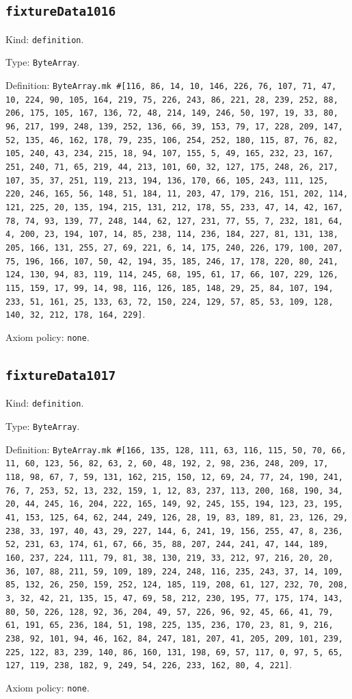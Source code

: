 \documentclass[11pt]{article}
\begin{document}
\subsection*{\texttt{fixtureData1016}}
\noindent Kind: \texttt{definition}.\par
\noindent Type: \texttt{ByteArray}.\par
\noindent Definition: \texttt{ByteArray.mk \#[116, 86, 14, 10, 146, 226, 76, 107, 71, 47, 10, 224, 90, 105, 164, 219, 75, 226, 243, 86, 221, 28, 239, 252, 88, 206, 175, 105, 167, 136, 72, 48, 214, 149, 246, 50, 197, 19, 33, 80, 96, 217, 199, 248, 139, 252, 136, 66, 39, 153, 79, 17, 228, 209, 147, 52, 135, 46, 162, 178, 79, 235, 106, 254, 252, 180, 115, 87, 76, 82, 105, 240, 43, 234, 215, 18, 94, 107, 155, 5, 49, 165, 232, 23, 167, 251, 240, 71, 65, 219, 44, 213, 101, 60, 32, 127, 175, 248, 26, 217, 107, 35, 37, 251, 119, 213, 194, 136, 170, 66, 105, 243, 111, 125, 220, 246, 165, 56, 148, 51, 184, 11, 203, 47, 179, 216, 151, 202, 114, 121, 225, 20, 135, 194, 215, 131, 212, 178, 55, 233, 47, 14, 42, 167, 78, 74, 93, 139, 77, 248, 144, 62, 127, 231, 77, 55, 7, 232, 181, 64, 4, 200, 23, 194, 107, 14, 85, 238, 114, 236, 184, 227, 81, 131, 138, 205, 166, 131, 255, 27, 69, 221, 6, 14, 175, 240, 226, 179, 100, 207, 75, 196, 166, 107, 50, 42, 194, 35, 185, 246, 17, 178, 220, 80, 241, 124, 130, 94, 83, 119, 114, 245, 68, 195, 61, 17, 66, 107, 229, 126, 115, 159, 17, 99, 14, 98, 116, 126, 185, 148, 29, 25, 84, 107, 194, 233, 51, 161, 25, 133, 63, 72, 150, 224, 129, 57, 85, 53, 109, 128, 140, 32, 212, 178, 164, 229]}.\par
\noindent Axiom policy: \texttt{none}.\par
\subsection*{\texttt{fixtureData1017}}
\noindent Kind: \texttt{definition}.\par
\noindent Type: \texttt{ByteArray}.\par
\noindent Definition: \texttt{ByteArray.mk \#[166, 135, 128, 111, 63, 116, 115, 50, 70, 66, 11, 60, 123, 56, 82, 63, 2, 60, 48, 192, 2, 98, 236, 248, 209, 17, 118, 98, 67, 7, 59, 131, 162, 215, 150, 12, 69, 24, 77, 24, 190, 241, 76, 7, 253, 52, 13, 232, 159, 1, 12, 83, 237, 113, 200, 168, 190, 34, 20, 44, 245, 16, 204, 222, 165, 149, 92, 245, 155, 194, 123, 23, 195, 41, 153, 125, 64, 62, 244, 249, 126, 28, 19, 83, 189, 81, 23, 126, 29, 238, 33, 197, 40, 43, 29, 227, 144, 6, 241, 19, 156, 255, 47, 8, 236, 52, 231, 63, 174, 61, 67, 66, 35, 88, 207, 244, 241, 47, 144, 189, 160, 237, 224, 111, 79, 81, 38, 130, 219, 33, 212, 97, 216, 20, 20, 36, 107, 88, 211, 59, 109, 189, 224, 248, 116, 235, 243, 37, 14, 109, 85, 132, 26, 250, 159, 252, 124, 185, 119, 208, 61, 127, 232, 70, 208, 3, 32, 42, 21, 135, 15, 47, 69, 58, 212, 230, 195, 77, 175, 174, 143, 80, 50, 226, 128, 92, 36, 204, 49, 57, 226, 96, 92, 45, 66, 41, 79, 61, 191, 65, 236, 184, 51, 198, 225, 135, 236, 170, 23, 81, 9, 216, 238, 92, 101, 94, 46, 162, 84, 247, 181, 207, 41, 205, 209, 101, 239, 225, 122, 83, 239, 140, 86, 160, 131, 198, 69, 57, 117, 0, 97, 5, 65, 127, 119, 238, 182, 9, 249, 54, 226, 233, 162, 80, 4, 221]}.\par
\noindent Axiom policy: \texttt{none}.\par
\end{document}
